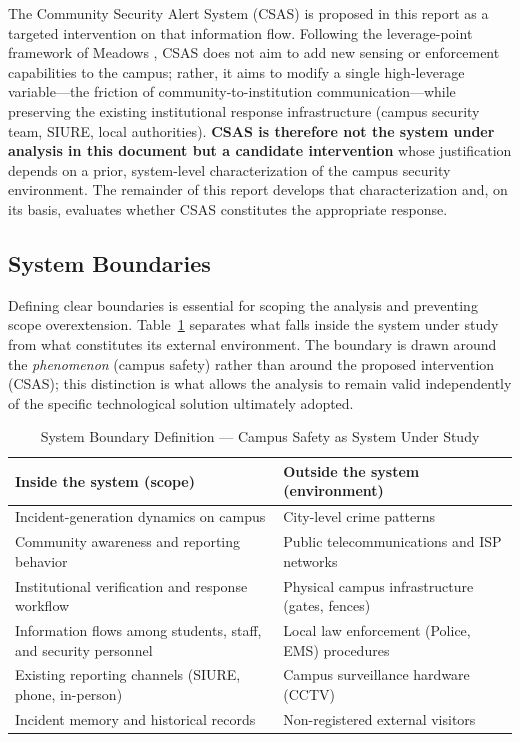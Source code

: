 \documentclass[conference]{IEEEtran}
\begin{document}
The Community Security Alert System (CSAS) is proposed in this report
as a targeted intervention on that information flow. Following the
leverage-point framework of Meadows \cite{meadows}, CSAS does not aim
to add new sensing or enforcement capabilities to the campus; rather,
it aims to modify a single high-leverage variable---the friction of
community-to-institution communication---while preserving the existing
institutional response infrastructure (campus security team, SIURE,
local authorities). \textbf{CSAS is therefore not the system under
analysis in this document but a candidate intervention} whose
justification depends on a prior, system-level characterization of the
campus security environment. The remainder of this report develops
that characterization and, on its basis, evaluates whether CSAS
constitutes the appropriate response.

\subsection{System Boundaries}
\label{sec:boundaries}
Defining clear boundaries is essential for scoping the analysis and
preventing scope overextension. Table~\ref{tab:boundary} separates
what falls inside the system under study from what constitutes its
external environment. The boundary is drawn around the
\emph{phenomenon} (campus safety) rather than around the proposed
intervention (CSAS); this distinction is what allows the analysis to
remain valid independently of the specific technological solution
ultimately adopted.

\begin{table}[h]
\caption{System Boundary Definition --- Campus Safety as System Under Study}
\label{tab:boundary}
\centering
\renewcommand{\arraystretch}{1.15}
\begin{tabularx}{\columnwidth}{XX}
\toprule
\textbf{Inside the system (scope)} & \textbf{Outside the system (environment)} \\
\midrule
Incident-generation dynamics on campus & City-level crime patterns \\
Community awareness and reporting behavior & Public telecommunications and ISP networks \\
Institutional verification and response workflow & Physical campus infrastructure (gates, fences) \\
Information flows among students, staff, and security personnel & Local law enforcement (Police, EMS) procedures \\
Existing reporting channels (SIURE, phone, in-person) & Campus surveillance hardware (CCTV) \\
Incident memory and historical records & Non-registered external visitors \\
\bottomrule
\end{tabularx}
\end{table}
\end{document}
